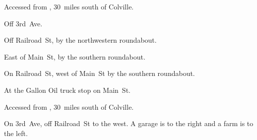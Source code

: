 
\begin{LocationList}

Accessed from , 30~miles south of Colville.

Off  3rd~Ave.

Off Railroad~St, by the northwestern roundabout.

East of  Main~St, by the southern roundabout.

On Railroad~St, west of  Main~St by the southern roundabout.

At the Gallon Oil truck stop on   Main~St.

Accessed from , 30~miles south of Colville.

On 3rd~Ave, off Railroad~St to the west.
A garage is to the right and a farm is to the left.

\end{LocationList}
